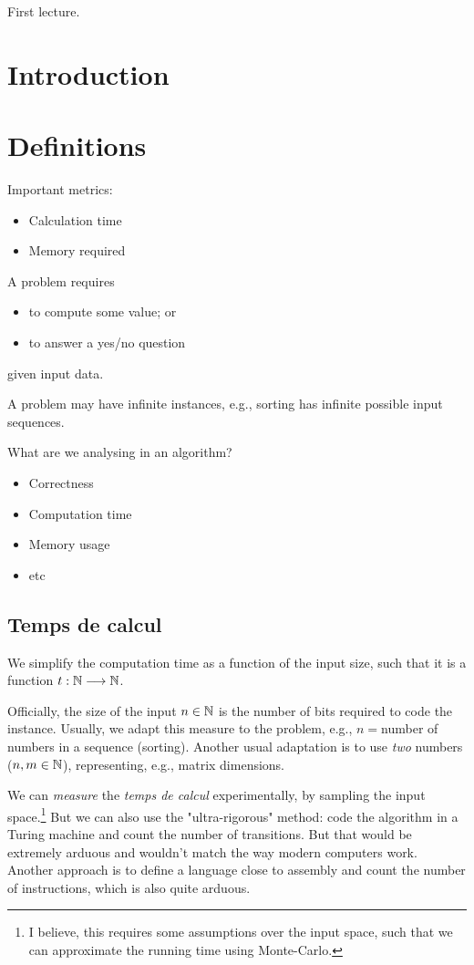 
First lecture.

\section*{Introduction}

\section*{Definitions}

Important metrics:
\begin{itemize}
    \item Calculation time
    \item Memory required
\end{itemize}

A problem requires
\begin{itemize}
    \item to compute some value; or
    \item to answer a yes/no question
\end{itemize}
given input data.

A problem may have infinite instances, e.g., sorting has infinite possible input sequences.

What are we analysing in an algorithm?
\begin{itemize}
    \item Correctness
    \item Computation time
    \item Memory usage
    \item etc
\end{itemize}

\subsection*{Temps de calcul}

We simplify the computation time as a function of the input size, such that it is a function $t: \mathbb{N} \longrightarrow \mathbb{N}$.

Officially, the size of the input $n\in \mathbb{N}$ is the number of bits required to code the instance.
Usually, we adapt this measure to the problem, e.g., $n=$number of numbers in a sequence (sorting).
Another usual adaptation is to use \emph{two} numbers ($n,m\in \mathbb{N}$), representing, e.g., matrix dimensions.

We can \emph{measure} the  \emph{temps de calcul} experimentally, by sampling the input space.\footnote{I believe, this requires some assumptions over the input space, such that we can approximate the running time using Monte-Carlo.}
But we can also use the "ultra-rigorous" method:
code the algorithm in a Turing machine and count the number of transitions.
But that would be extremely arduous and wouldn't match the way modern computers work.
Another approach is to define a language close to assembly and count the number of instructions, which is also quite arduous.


